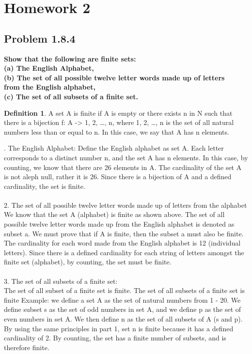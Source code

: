 \documentclass[12pt]{article}
\theoremstyle{definition}
\newtheorem{definition}[theorem]{Definition}
\numberwithin{equation}{subsection}
\begin{document}
\section{Homework 2}

\subsection{Problem 1.8.4}
\textbf{Show that the following are finite sets: \\ (a) The English Alphabet, \\ (b) The set of all possible twelve letter words made up of letters \\from the English alphabet, \\ (c) The set of all subsets of a finite set.}
\begin{definition} A set A is finite if A is empty or there exists n in N such that there is a bijection f: A -> {1, 2, …, n}, where {1, 2, …, n} is the set of all natural numbers less than or equal to n. In this case, we say that A has n elements.
\end{definition}
. The English Alphabet:
\noindent Define the English alphabet as set A. Each letter corresponds to a distinct number n, and the set A has n elements. In this case, by counting, we know that there are 26 elements in A. The cardinality of the set A is not aleph null, rather it is 26. 
Since there is a bijection of A and a defined cardinality, the set is finite.
\\
\\
2. The set of all possible twelve letter words made up of letters from the alphabet
\\
We know that the set A (alphabet) is finite as shown above. The set of all possible twelve letter words made up from the English alphabet is denoted as subset a. We must prove that if A is finite, then the subset a must also be finite. 
The cardinality for each word made from the English alphabet is 12 (individual letters). Since there is a defined cardinality for each string of letters amongst the finite set (alphabet), by counting, the set must be finite.
\\
\\
3. The set of all subsets of a finite set:
\\
The set of all subset of a finite set is finite. 
The set of all subsets of a finite set is finite
Example: we define a set A as the set of natural numbers from 1 - 20. We define subset s as the set of odd numbers in set A, and we define p as the set of even numbers in set A. We then define n as the set of all subsets of A (s and p). By using the same principles in part 1, set n is finite because it has a defined cardinality of 2. By counting, the set has a finite number of subsets, and is therefore finite. 
\end{document}
